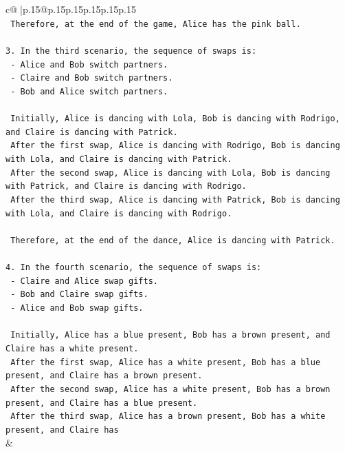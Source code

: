 \documentclass{article}
\begin{document}
{\begin{supertabular}{c@{$\;$}|p{.15\linewidth}@{}p{.15\linewidth}p{.15\linewidth}p{.15\linewidth}p{.15\linewidth}p{.15\linewidth}}
{{{\\ 
\texttt{   Therefore, at the end of the game, Alice has the pink ball.} \\
\\ 
\texttt{3. In the third scenario, the sequence of swaps is:} \\
\texttt{   {-} Alice and Bob switch partners.} \\
\texttt{   {-} Claire and Bob switch partners.} \\
\texttt{   {-} Bob and Alice switch partners.} \\
\\ 
\texttt{   Initially, Alice is dancing with Lola, Bob is dancing with Rodrigo, and Claire is dancing with Patrick.} \\
\texttt{   After the first swap, Alice is dancing with Rodrigo, Bob is dancing with Lola, and Claire is dancing with Patrick.} \\
\texttt{   After the second swap, Alice is dancing with Lola, Bob is dancing with Patrick, and Claire is dancing with Rodrigo.} \\
\texttt{   After the third swap, Alice is dancing with Patrick, Bob is dancing with Lola, and Claire is dancing with Rodrigo.} \\
\\ 
\texttt{   Therefore, at the end of the dance, Alice is dancing with Patrick.} \\
\\ 
\texttt{4. In the fourth scenario, the sequence of swaps is:} \\
\texttt{   {-} Claire and Alice swap gifts.} \\
\texttt{   {-} Bob and Claire swap gifts.} \\
\texttt{   {-} Alice and Bob swap gifts.} \\
\\ 
\texttt{   Initially, Alice has a blue present, Bob has a brown present, and Claire has a white present.} \\
\texttt{   After the first swap, Alice has a white present, Bob has a blue present, and Claire has a brown present.} \\
\texttt{   After the second swap, Alice has a white present, Bob has a brown present, and Claire has a blue present.} \\
\texttt{   After the third swap, Alice has a brown present, Bob has a white present, and Claire has} \\
            }
        }
    }
    & \\ \\


\end{supertabular}}
\end{document}
